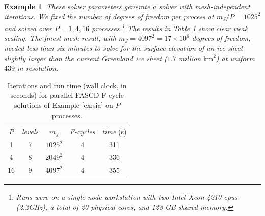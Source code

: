 \documentclass[letterpaper,final,12pt,reqno]{amsart}
\theoremstyle{cstyle}
\theoremstyle{cstyle*}
\theoremstyle{dstyle}
\newtheorem{example}[theorem]{Example}
\numberwithin{equation}{section}
\numberwithin{figure}{section}
\numberwithin{table}{section}
\numberwithin{theorem}{section}
\begin{document}
\begin{example}
These solver parameters generate a solver with mesh-independent iterations.  We fixed the number of degrees of freedom per process at $m_J/P=1025^2$ and solved over $P=1,4,16$ processes.\footnote{Runs were on a single-node workstation with two Intel Xeon 4210 cpus (2.2GHz), a total of 20 physical cores, and 128 GB shared memory.}  The results in Table \ref{tab:results:siaweak} show clear weak scaling.  The finest mesh result, with $m_J=4097^2=17 \times 10^6$ degrees of freedom, needed less than six minutes to solve for the surface elevation of an ice sheet slightly larger than the current Greenland ice sheet ($1.7$ million $\text{km}^2$) at uniform $439$ m resolution.
\end{example}

\begin{table}[ht]
\begin{tabular}{c@{\hskip 4mm}c@{\hskip 4mm}c@{\hskip 7mm}c@{\hskip 4mm}c}
$P$ & \emph{levels} & $m_J$ & \emph{F-cycles} & \emph{time} (s) \\ \cmidrule{1-5}
 1 & 7 & $1025^2$ & 4 & 311 \\
 4 & 8 & $2049^2$ & 4 & 336 \\
16 & 9 & $4097^2$ & 4 & 355
\end{tabular}
\bigskip
\caption{Iterations and run time (wall clock, in seconds) for parallel FASCD F-cycle solutions of Example \ref{ex:sia} on $P$ processes.}
\label{tab:results:siaweak}
\end{table}

\end{document}
